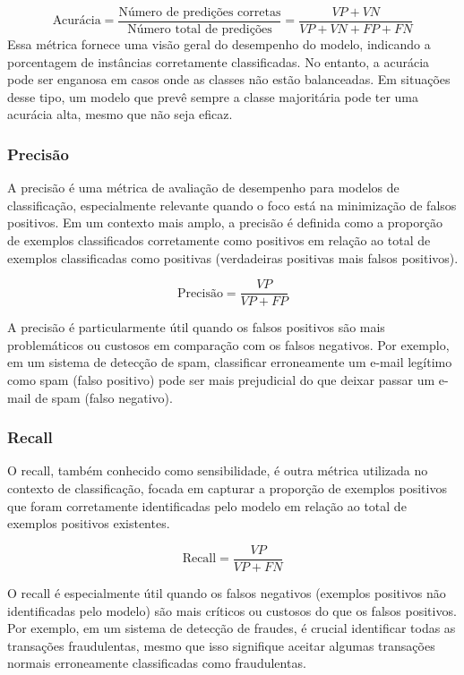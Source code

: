 \begin{equation}
  \text{Acurácia} = \frac{\text{Número de predições corretas}}{\text{Número total de predições}} = \frac{VP+VN}{VP+VN+FP+FN}
\end{equation}
Essa métrica fornece uma visão geral do desempenho do modelo, indicando a porcentagem de instâncias corretamente classificadas.
 No entanto, a acurácia pode ser enganosa em casos onde as classes não estão balanceadas. 
 Em situações desse tipo, um modelo que prevê sempre a classe majoritária pode ter uma acurácia alta, mesmo que não seja eficaz.

\subsubsection{Precisão}

A precisão é uma métrica de avaliação de desempenho para modelos de classificação, especialmente 
relevante quando o foco está na minimização de falsos positivos. Em um contexto mais amplo, 
a precisão é definida como a proporção de exemplos classificados corretamente como positivos em 
relação ao total de exemplos classificadas como positivas (verdadeiras positivas mais falsos positivos).

\begin{equation}
  \text{Precisão} = \frac{VP}{VP + FP}
\end{equation}

A precisão é particularmente útil quando os falsos positivos são mais problemáticos ou custosos
em comparação com os falsos negativos. Por exemplo, em um sistema de detecção de spam, classificar 
erroneamente um e-mail legítimo como spam (falso positivo) pode ser mais prejudicial do que deixar
passar um e-mail de spam (falso negativo).

\subsubsection{Recall}

O recall, também conhecido como sensibilidade, é outra métrica utilizada no contexto de classificação, 
focada em capturar a proporção de exemplos positivos que foram corretamente identificadas pelo modelo
em relação ao total de exemplos positivos existentes.

\begin{equation}
  \text{Recall} = \frac{VP}{VP + FN}
\end{equation}

O recall é especialmente útil quando os falsos negativos (exemplos positivos não identificadas pelo modelo) 
são mais críticos ou custosos do que os falsos positivos. Por exemplo, em um sistema de detecção de fraudes,
é crucial identificar todas as transações fraudulentas, mesmo que isso signifique aceitar algumas transações 
normais erroneamente classificadas como fraudulentas.


